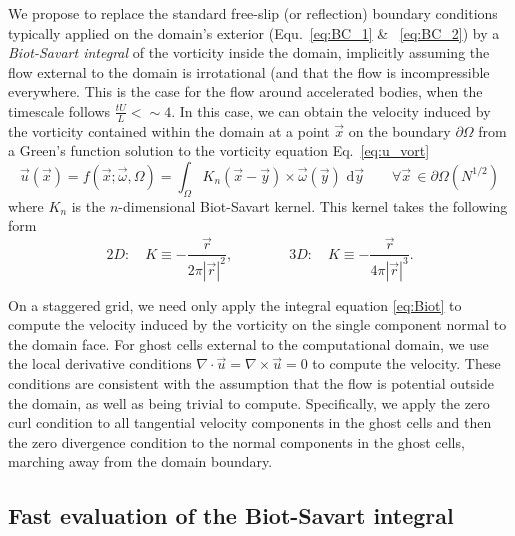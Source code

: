 \documentclass{article}
\begin{document}
We propose to replace the standard free-slip (or reflection) boundary conditions typically applied on the domain's exterior (Equ.~\ref{eq:BC_1} \& ~\ref{eq:BC_2}) by a \emph{Biot-Savart integral} of the vorticity inside the domain, implicitly assuming the flow external to the domain is irrotational (and that the flow is incompressible everywhere. This is the case for the flow around accelerated bodies, when the timescale follows $\frac{tU}{L}<\sim 4$. In this case, we can obtain the velocity induced by the vorticity contained within the domain at a point $\vec x$ on the boundary $\partial\Omega$ from a Green's function solution to the vorticity equation Eq.~\ref{eq:u_vort}
\begin{equation}\label{eq:Biot}
    {\vec u}({\vec x}) = f(\vec x; \vec\omega,\Omega) = \int_\Omega K_{n}({\vec x} - \vec{y})\times \vec\omega({\vec y})\text{ d}\vec{y} \quad\quad \forall \vec x\, \in \partial\Omega (N^{1/2})
\end{equation}
where $K_n$ is the $n$-dimensional Biot-Savart kernel. This kernel takes the following form \cite{Eldredge2019MathematicalFlows}
\begin{equation}
    2D:\quad K\equiv -\frac{\vec{r}}{2\pi|\vec{r}|^2}, \qquad\qquad 3D:\quad K\equiv -\frac{\vec{r}}{4\pi|\vec{r}|^3}.
\end{equation}

On a staggered grid, we need only apply the integral equation \ref{eq:Biot} to compute the velocity induced by the vorticity on the single component normal to the domain face. For ghost cells external to the computational domain, we use the local derivative conditions $\nabla\cdot\vec{u} = \nabla\times\vec{u}=0$ to compute the velocity. These conditions are consistent with the assumption that the flow is potential outside the domain, as well as being trivial to compute. Specifically, we apply the zero curl condition to all tangential velocity components in the ghost cells and then the zero divergence condition to the normal components in the ghost cells, marching away from the domain boundary.


\subsection{Fast evaluation of the Biot-Savart integral}
\end{document}
